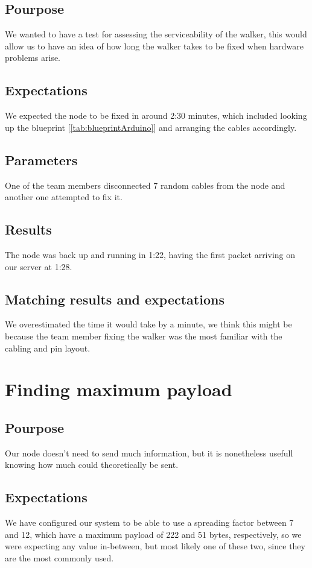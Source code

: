	\subsection*{Pourpose}
		We wanted to have a test for assessing the serviceability of the walker, this would allow us to have an idea of how long the walker takes to be fixed when hardware problems arise.
	\subsection*{Expectations}
		We expected the node to be fixed in around 2:30 minutes, which included looking up the blueprint [\ref{tab:blueprintArduino}] and arranging the cables accordingly.
	\subsection*{Parameters}
		One of the team members disconnected 7 random cables from the node and another one attempted to fix it.
	\subsection*{Results}
		The node was back up and running in 1:22, having the first packet arriving on our server at 1:28.
	\subsection*{Matching results and expectations}
		We overestimated the time it would take by a minute, we think this might be because the team member fixing the walker was the most familiar with the cabling and pin layout.

\section{Finding maximum payload}

	\subsection*{Pourpose}
		Our node doesn't need to send much information, but it is nonetheless usefull knowing how much could theoretically be sent.
	\subsection*{Expectations}
		We have configured our system to be able to use a spreading factor between 7 and 12, which have a maximum payload of 222 and 51 bytes, respectively, so we were expecting any value in-between, but most likely one of these two, since they are the most commonly used.

